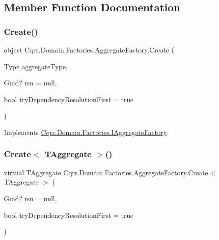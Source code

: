 \subsection{Member Function Documentation}
\mbox{\label{classCqrs_1_1Domain_1_1Factories_1_1AggregateFactory_a917794af09bb3f51629e7abc231f8441_a917794af09bb3f51629e7abc231f8441}} 
\subsubsection{\texorpdfstring{Create()}{Create()}}
{\footnotesize\ttfamily object Cqrs.\+Domain.\+Factories.\+Aggregate\+Factory.\+Create (\begin{DoxyParamCaption}\item[{Type}]{aggregate\+Type,  }\item[{Guid?}]{rsn = {\ttfamily null},  }\item[{bool}]{try\+Dependency\+Resolution\+First = {\ttfamily true} }\end{DoxyParamCaption})}



Implements \hyperlink{interfaceCqrs_1_1Domain_1_1Factories_1_1IAggregateFactory_ade388f0dfa9c42964392159a4f97fb1e_ade388f0dfa9c42964392159a4f97fb1e}{Cqrs.\+Domain.\+Factories.\+I\+Aggregate\+Factory}.

\mbox{\label{classCqrs_1_1Domain_1_1Factories_1_1AggregateFactory_ac155d6c1e55ba37bacf420185b652092_ac155d6c1e55ba37bacf420185b652092}} 
\subsubsection{\texorpdfstring{Create$<$ T\+Aggregate $>$()}{Create< TAggregate >()}}
{\footnotesize\ttfamily virtual T\+Aggregate \hyperlink{classCqrs_1_1Domain_1_1Factories_1_1AggregateFactory_a917794af09bb3f51629e7abc231f8441_a917794af09bb3f51629e7abc231f8441}{Cqrs.\+Domain.\+Factories.\+Aggregate\+Factory.\+Create}$<$ T\+Aggregate $>$ (\begin{DoxyParamCaption}\item[{Guid?}]{rsn = {\ttfamily null},  }\item[{bool}]{try\+Dependency\+Resolution\+First = {\ttfamily true} }\end{DoxyParamCaption})\hspace{0.3cm}{\ttfamily [virtual]}}



